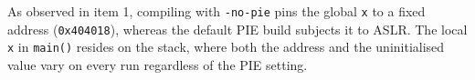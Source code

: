 
As observed in item 1, compiling with \texttt{-no-pie} pins the global
\texttt{x} to a fixed address (\texttt{0x404018}), whereas the default PIE
build subjects it to ASLR. The local \texttt{x} in \texttt{main()} resides on
the stack, where both the address and the uninitialised value vary on every run
regardless of the PIE setting.
